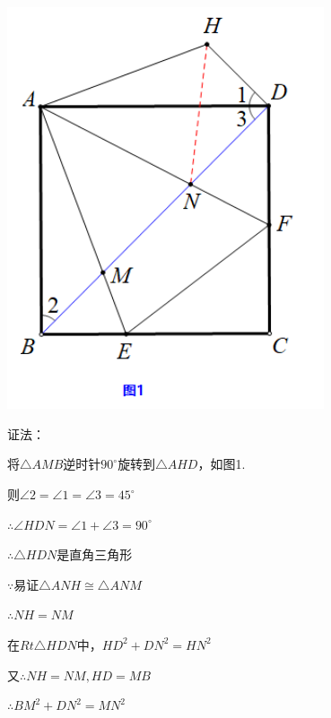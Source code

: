 \documentclass[10pt]{ctexart}
\begin{document}
{\kaishu\color{blue}
\begin{minipage}[h]{0.4\textwidth}
	\centering
	\includegraphics[width=0.7\textwidth]{figure/banjiao12}
\end{minipage}
\quad
\begin{minipage}[h]{0.6\textwidth}
证法：

将$\triangle AMB$逆时针$90^\circ$旋转到$\triangle AHD$，如图1.

则$\angle 2=\angle 1=\angle 3=45^\circ$

$\therefore \angle HDN=\angle 1+\angle 3=90^\circ$

$\therefore \triangle HDN$是直角三角形

$\because$易证$\triangle ANH\cong \triangle ANM$

$\therefore NH=NM$

在$Rt\triangle HDN$中，$HD^2+DN^2=HN^2$

又$\therefore NH=NM,HD=MB$

$\therefore BM^2+DN^2=MN^2$
\end{minipage}



}
\end{document}
